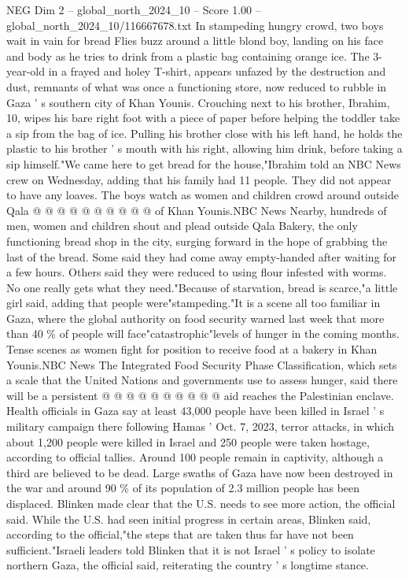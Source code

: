 \begin{textsample}{NEG Dim 2 – global\_north\_2024\_10 – Score 1.00 – global\_north\_2024\_10/116667678.txt}  \label{ex:f2_neg_373}
In stampeding hungry crowd, two boys wait in vain for bread Flies buzz around a little blond boy, landing on his face and body as he tries to drink from a plastic bag containing orange ice.
The 3-year-old in a frayed and holey T-shirt, appears unfazed by the destruction and dust, remnants of what was once a functioning store, now reduced to rubble in Gaza ' s southern city of Khan Younis.
Crouching next to his brother, Ibrahim, 10, wipes his bare right foot with a piece of paper before helping the toddler take a sip from the bag of ice.
Pulling his brother close with his left hand, he holds the plastic to his brother ' s mouth with his right, allowing him drink, before taking a sip himself."We came here to get bread for the house,"Ibrahim told an NBC News crew on Wednesday, adding that his family had 11 people.
They did not appear to have any loaves.
The boys watch as women and children crowd around outside Qala @ @ @ @ @ @ @ @ @ @ of Khan Younis.NBC News Nearby, hundreds of men, women and children shout and plead outside Qala Bakery, the only functioning bread shop in the city, surging forward in the hope of grabbing the last of the bread.
Some said they had come away empty-handed after waiting for a few hours.
Others said they were reduced to using flour infested with worms.
No one really gets what they need."Because of starvation, bread is scarce,"a little girl said, adding that people were"stampeding."It is a scene all too familiar in Gaza, where the global authority on food security warned last week that more than 40 \% of people will face"catastrophic"levels of hunger in the coming months.
Tense scenes as women fight for position to receive food at a bakery in Khan Younis.NBC News The Integrated Food Security Phase Classification, which sets a scale that the United Nations and governments use to assess hunger, said there will be a persistent @ @ @ @ @ @ @ @ @ @ aid reaches the Palestinian enclave.
Health officials in Gaza say at least 43,000 people have been killed in Israel ' s military campaign there following Hamas ' Oct. 7, 2023, terror attacks, in which about 1,200 people were killed in Israel and 250 people were taken hostage, according to official tallies.
Around 100 people remain in captivity, although a third are believed to be dead.
Large swaths of Gaza have now been destroyed in the war and around 90 \% of its population of 2.3 million people has been displaced.
Blinken made clear that the U.S. needs to see more action, the official said.
While the U.S. had seen initial progress in certain areas, Blinken said, according to the official,"the steps that are taken thus far have not been sufficient."Israeli leaders told Blinken that it is not Israel ' s policy to isolate northern Gaza, the official said, reiterating the country ' s longtime stance.

\end{textsample}
